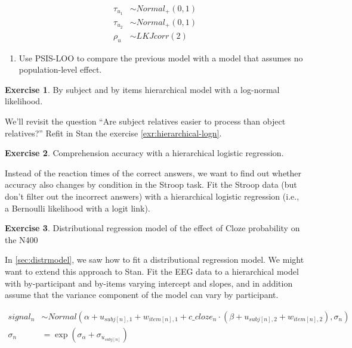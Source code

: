\documentclass[12pt,]{krantz}
\providecommand{\tightlist}{%
  \setlength{\itemsep}{0pt}\setlength{\parskip}{0pt}}
\theoremstyle{definition}
\theoremstyle{definition}
\theoremstyle{definition}
\newtheorem{exercise}{Exercise}[chapter]
\theoremstyle{remark}
\begin{document}
\begin{equation}
\begin{aligned}
\tau_{u_1} &\sim Normal_+(0,1)\\
\tau_{u_2} &\sim Normal_+(0,1)\\
\rho_u &\sim LKJcorr(2) 
\end{aligned}
\end{equation}

\begin{enumerate}
\def\labelenumi{\alph{enumi}.}
\setcounter{enumi}{1}
\tightlist
\item
  Use PSIS-LOO to compare the previous model with a model that assumes no population-level effect.
\end{enumerate}

\begin{exercise}
\protect\hypertarget{exr:hierarchical-logn-stan}{}{\label{exr:hierarchical-logn-stan} }By subject and by items hierarchical model with a log-normal likelihood.
\end{exercise}

We'll revisit the question ``Are subject relatives easier to process than object relatives?'' Refit in Stan the exercise \ref{exr:hierarchical-logn}.

\begin{exercise}
\protect\hypertarget{exr:strooplogis}{}{\label{exr:strooplogis} }Comprehension accuracy with a hierarchical logistic regression.
\end{exercise}

Instead of the reaction times of the correct answers, we want to find out whether accuracy also changes by condition in the Stroop task. Fit the Stroop data (but don't filter out the incorrect answers) with a hierarchical logistic regression (i.e., a Bernoulli likelihood with a logit link).

\begin{exercise}
\protect\hypertarget{exr:distr-stan}{}{\label{exr:distr-stan} }Distributional regression model of the effect of Cloze probability on the N400
\end{exercise}

In \ref{sec:distrmodel}, we saw how to fit a distributional regression model. We might want to extend this approach to Stan. Fit the EEG data to a hierarchical model with by-participant and by-items varying intercept and slopes, and in addition assume that the variance component of the model can vary by participant.

\begin{equation}
\begin{aligned}
  signal_n &\sim Normal(\alpha + u_{subj[n],1} + w_{item[n],1} + c\_cloze_n \cdot  (\beta + u_{subj[n],2}+ w_{item[n],2}), \sigma_n)\\
  \sigma_n &= \exp(\sigma_\alpha + \sigma_{u_{subj[n]}})
\end{aligned}
\end{equation}
\end{document}
